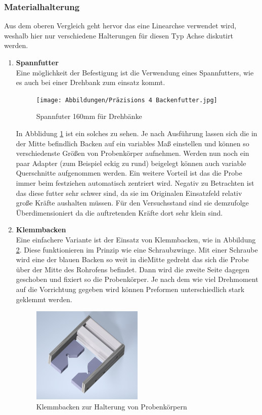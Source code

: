 \subsubsection{Materialhalterung}
Aus dem oberen Vergleich geht hervor das eine Linearchse verwendet wird, weshalb hier nur verschiedene Halterungen für diesen Typ Achse diskutirt werden.

\begin{enumerate}[label=(\alph*)]

\item \textbf{Spannfutter}\\
Eine möglichkeit der Befestigung ist die Verwendung eines Spannfutters, wie es auch bei einer Drehbank zum einsatz kommt. 

\begin{figure}[!h]
    \centering
    \texttt{[image: Abbildungen/Präzisions 4 Backenfutter.jpg]}
    \caption{Spannfuter 160mm für Drehbänke \cite{MUK24.13.01.2024}}
    \label{fig:spannfutter}
\end{figure}

In Abblidung \ref{fig:spannfutter} ist ein solches zu sehen. Je nach Ausführung lassen sich die in der Mitte befindlich Backen auf ein variables Maß einstellen und können so verschiedenste Größen von Probenkörper aufnehmen. Werden nun noch ein paar Adapter (zum Beispiel eckig zu rund) beigelegt können auch variable Querschnitte aufgenommen werden. Ein weitere Vorteil ist das die Probe immer beim festziehen automatisch zentriert wird. Negativ zu Betrachten ist das diese futter sehr schwer sind, da sie im Originalen Einsatzfeld relativ große Kräfte aushalten müssen. Für den Versuchsstand sind sie demzufolge Überdimensioniert da die auftretenden Kräfte dort sehr klein sind.

\item \textbf{Klemmbacken}\\
Eine einfachere Variante ist der Einsatz von Klemmbacken, wie in Abbildung \ref{fig:klemm_linear}. Diese funktionieren im Prinzip wie eine Schraubzwinge. Mit einer Schraube wird eine der blauen Backen so weit in dieMitte gedreht das sich die Probe über der Mitte des Rohrofens befindet. Dann wird die zweite Seite dagegen geschoben und fixiert so die Probenkörper. Je nach dem wie viel Drehmoment auf die Vorrichtung gegeben wird können Preformen unterschiedlich stark geklemmt werden. 

\begin{figure}[!h]
    \centering
    \includegraphics[width = 0.5\textwidth]{Abbildungen/aufnehmer_linear.png}
    \caption{Klemmbacken zur Halterung von Probenkörpern}
    \label{fig:klemm_linear}
\end{figure}


\end{enumerate}

